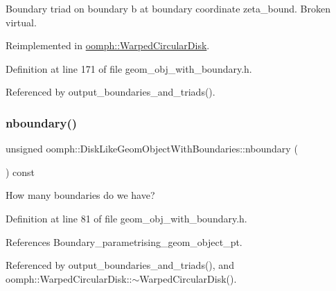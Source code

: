 Boundary triad on boundary b at boundary coordinate zeta\+\_\+bound. Broken virtual. 



Reimplemented in \hyperlink{classoomph_1_1WarpedCircularDisk_aa24472806fff65e4950d71dd9536965f}{oomph\+::\+Warped\+Circular\+Disk}.



Definition at line 171 of file geom\+\_\+obj\+\_\+with\+\_\+boundary.\+h.



Referenced by output\+\_\+boundaries\+\_\+and\+\_\+triads().

\mbox{\label{classoomph_1_1DiskLikeGeomObjectWithBoundaries_abc85fcf43c0bb0874c092431ec12209e}} 
\subsubsection{\texorpdfstring{nboundary()}{nboundary()}}
{\footnotesize\ttfamily unsigned oomph\+::\+Disk\+Like\+Geom\+Object\+With\+Boundaries\+::nboundary (\begin{DoxyParamCaption}{ }\end{DoxyParamCaption}) const\hspace{0.3cm}{\ttfamily [inline]}}



How many boundaries do we have? 



Definition at line 81 of file geom\+\_\+obj\+\_\+with\+\_\+boundary.\+h.



References Boundary\+\_\+parametrising\+\_\+geom\+\_\+object\+\_\+pt.



Referenced by output\+\_\+boundaries\+\_\+and\+\_\+triads(), and oomph\+::\+Warped\+Circular\+Disk\+::$\sim$\+Warped\+Circular\+Disk().

\mbox{\label{classoomph_1_1DiskLikeGeomObjectWithBoundaries_ad083be3c9cf9b9b493bc3e38ad809fc8}} 

